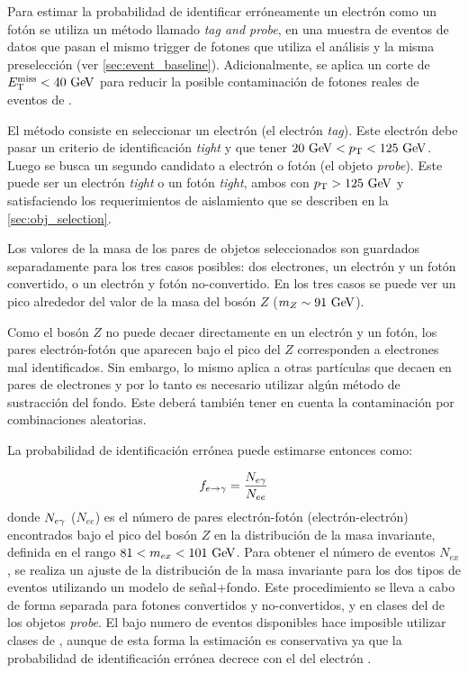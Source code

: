 Para estimar la probabilidad de identificar erróneamente un electrón como un
fotón {\feg} se utiliza un método llamado \emph{tag and probe}, en una muestra
de eventos de datos {\Zee} que pasan el mismo trigger de fotones que utiliza el
análisis y la misma preselección (ver \cref{sec:event_baseline}). Adicionalmente, se
aplica un corte de $\met < 40 \gev$ para reducir la posible contaminación de
fotones reales de eventos de {\wgam}.

El método consiste en seleccionar un electrón (el electrón \emph{tag}). Este
electrón debe pasar un criterio de identificación \emph{tight} y que tener $20
\gev < \pt < 125 \gev$. Luego se busca un segundo candidato a electrón o fotón
(el objeto \emph{probe}). Este puede ser un electrón \emph{tight} o un fotón
\emph{tight}, ambos con $\pt > 125\gev$ y satisfaciendo los requerimientos de
aislamiento que se describen en la \cref{sec:obj_selection}.

Los valores de la masa de los pares de objetos seleccionados son guardados
separadamente para los tres casos posibles: dos electrones, un electrón y un
fotón convertido, o un electrón y fotón no-convertido. En los tres casos se
puede ver un pico alrededor del valor de la masa del bosón $Z$ ($m_Z \sim 91
\gev$).

Como el bosón $Z$ no puede decaer directamente en un electrón y un fotón, los
pares electrón-fotón que aparecen bajo el pico del $Z$ corresponden a electrones
mal identificados. Sin embargo, lo mismo aplica a otras partículas que decaen en
pares de electrones y por lo tanto es necesario utilizar algún método de
sustracción del fondo. Este deberá también tener en cuenta la contaminación por
combinaciones aleatorias.

La probabilidad de identificación errónea {\feg} puede estimarse entonces como:

\begin{equation}\label{eq:efakerate}
  f_{e\rightarrow\gamma} = \frac{N_{e\gamma}}{N_{ee}}
\end{equation}
%
donde $N_{e\gamma}$ ($N_{ee}$) es el número de pares electrón-fotón
(electrón-electrón) encontrados bajo el pico del bosón $Z$ en la distribución de
la masa invariante, definida en el rango $81 < m_{ex} < 101 \gev$. Para obtener
el número de eventos $N_{ex}$, se realiza un ajuste de la distribución de la
masa invariante para los dos tipos de eventos utilizando un modelo de
señal+fondo. Este procedimiento se lleva a cabo de forma separada para fotones
convertidos y no-convertidos, y en clases del {\abseta} de los objetos
\emph{probe}. El bajo numero de eventos disponibles hace imposible utilizar
clases de {\pt}, aunque de esta forma la estimación es conservativa ya que la
probabilidad de identificación errónea decrece con el {\pt} del electrón
\cite{Kuhl:1604846}.

